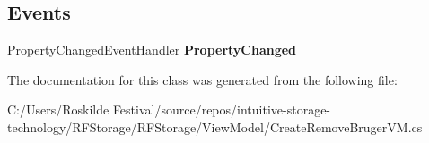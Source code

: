 \subsection*{Events}
\begin{DoxyCompactItemize}
\item 
\mbox{\label{class_r_f_storage_1_1_view_model_1_1_create_remove_bruger_v_m_a11b55d0b1c81d22e6e3aabf302ce8687}} 
Property\+Changed\+Event\+Handler {\bfseries Property\+Changed}
\end{DoxyCompactItemize}


The documentation for this class was generated from the following file\+:\begin{DoxyCompactItemize}
\item 
C\+:/\+Users/\+Roskilde Festival/source/repos/intuitive-\/storage-\/technology/\+R\+F\+Storage/\+R\+F\+Storage/\+View\+Model/Create\+Remove\+Bruger\+V\+M.\+cs\end{DoxyCompactItemize}
